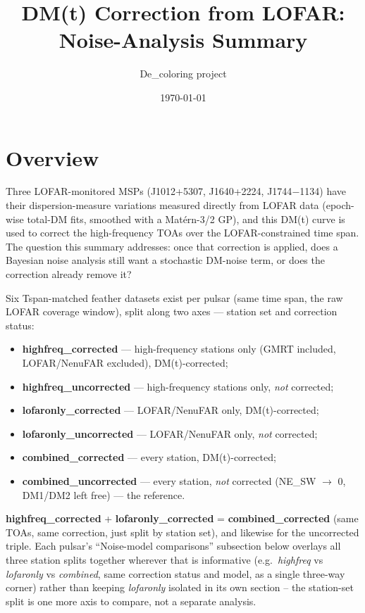 \documentclass[11pt]{article}
\title{DM(t) Correction from LOFAR: Noise-Analysis Summary}
\author{De\_coloring project}
\date{\today}
\begin{document}
\maketitle
\tableofcontents

\section{Overview}

Three LOFAR-monitored MSPs (J1012+5307, J1640+2224, J1744$-$1134) have their
dispersion-measure variations measured directly from LOFAR data (epoch-wise
total-DM fits, smoothed with a Mat\'ern-3/2 GP), and this DM(t) curve is used
to correct the high-frequency TOAs over the LOFAR-constrained time span. The
question this summary addresses: once that correction is applied, does a
Bayesian noise analysis still want a stochastic DM-noise term, or does the
correction already remove it?

Six Tspan-matched feather datasets exist per pulsar (same time span, the
raw LOFAR coverage window), split along two axes --- station set and
correction status:
\begin{itemize}
  \item \textbf{highfreq\_corrected} --- high-frequency stations only (GMRT
    included, LOFAR/NenuFAR excluded), DM(t)-corrected;
  \item \textbf{highfreq\_uncorrected} --- high-frequency stations only,
    \emph{not} corrected;
  \item \textbf{lofaronly\_corrected} --- LOFAR/NenuFAR only, DM(t)-corrected;
  \item \textbf{lofaronly\_uncorrected} --- LOFAR/NenuFAR only, \emph{not}
    corrected;
  \item \textbf{combined\_corrected} --- every station, DM(t)-corrected;
  \item \textbf{combined\_uncorrected} --- every station, \emph{not}
    corrected (NE\_SW $\to$ 0, DM1/DM2 left free) --- the reference.
\end{itemize}
\textbf{highfreq\_corrected} + \textbf{lofaronly\_corrected} =
\textbf{combined\_corrected} (same TOAs, same correction, just split by
station set), and likewise for the uncorrected triple. Each pulsar's
``Noise-model comparisons'' subsection below overlays all three station
splits together wherever that is informative (e.g.\ \emph{highfreq} vs
\emph{lofaronly} vs \emph{combined}, same correction status and model, as a
single three-way corner) rather than keeping \emph{lofaronly} isolated in
its own section -- the station-set split is one more axis to compare, not a
separate analysis.
\end{document}
